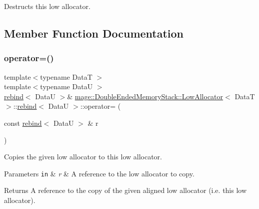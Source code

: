Destructs this low allocator. 

\subsection{Member Function Documentation}
\hypertarget{structmage_1_1_double_ended_memory_stack_1_1_low_allocator_1_1rebind_ad9015378ce09c362a25fd0a7d1b3eda5}{}\label{structmage_1_1_double_ended_memory_stack_1_1_low_allocator_1_1rebind_ad9015378ce09c362a25fd0a7d1b3eda5} 
\subsubsection{\texorpdfstring{operator=()}{operator=()}\hspace{0.1cm}{\footnotesize\ttfamily [1/2]}}
{\footnotesize\ttfamily template$<$typename DataT $>$ \\
template$<$typename DataU $>$ \\
\hyperlink{structmage_1_1_double_ended_memory_stack_1_1_low_allocator_1_1rebind}{rebind}$<$ DataU $>$\& \hyperlink{structmage_1_1_double_ended_memory_stack_1_1_low_allocator}{mage\+::\+Double\+Ended\+Memory\+Stack\+::\+Low\+Allocator}$<$ DataT $>$\+::\hyperlink{structmage_1_1_double_ended_memory_stack_1_1_low_allocator_1_1rebind}{rebind}$<$ DataU $>$\+::operator= (\begin{DoxyParamCaption}\item[{const \hyperlink{structmage_1_1_double_ended_memory_stack_1_1_low_allocator_1_1rebind}{rebind}$<$ DataU $>$ \&}]{r }\end{DoxyParamCaption})\hspace{0.3cm}{\ttfamily [delete]}}

Copies the given low allocator to this low allocator.


\begin{DoxyParams}[1]{Parameters}
\mbox{\tt in}  & {\em r} & A reference to the low allocator to copy. \\
\hline
\end{DoxyParams}
\begin{DoxyReturn}{Returns}
A reference to the copy of the given aligned low allocator (i.\+e. this low allocator). 
\end{DoxyReturn}
\hypertarget{structmage_1_1_double_ended_memory_stack_1_1_low_allocator_1_1rebind_a9ccd16e84aa36e483d813ca7ffdc6898}{}\label{structmage_1_1_double_ended_memory_stack_1_1_low_allocator_1_1rebind_a9ccd16e84aa36e483d813ca7ffdc6898} 
